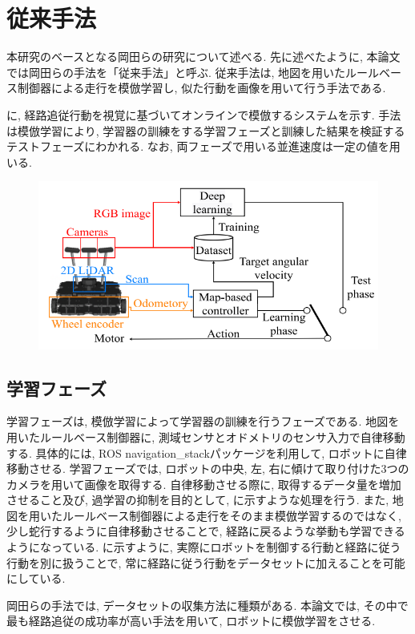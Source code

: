 
\section{従来手法}
本研究のベースとなる岡田らの研究について述べる. 先に述べたように, 本論文では岡田らの手法を「従来手法」と呼ぶ. 従来手法は, 地図を用いたルールベース制御器による走行を模倣学習し, 似た行動を画像を用いて行う手法である.\par
{}に, 経路追従行動を視覚に基づいてオンラインで模倣するシステムを示す. 手法は模倣学習により, 学習器の訓練をする学習フェーズと訓練した結果を検証するテストフェーズにわかれる. なお, 両フェーズで用いる並進速度は一定の値を用いる.

\vspace{3cm}

\begin{figure}[hbtp]
  \centering
 \includegraphics[keepaspectratio, scale=0.5]
      {images/imitation_sys.png}
 \caption{}
 \label{Fig:imitation_sys}
\end{figure}

\newpage

\subsection{学習フェーズ}
学習フェーズは, 模倣学習によって学習器の訓練を行うフェーズである. 地図を用いたルールベース制御器に, 測域センサとオドメトリのセンサ入力で自律移動する. 具体的には, ROS navigation\_stackパッケージを利用して, ロボットに自律移動させる. 学習フェーズでは, ロボットの中央, 左, 右に傾けて取り付けた3つのカメラを用いて画像を取得する. 自律移動させる際に, 取得するデータ量を増加させること及び, 過学習の抑制を目的として, に示すような処理を行う. また, 地図を用いたルールベース制御器による走行をそのまま模倣学習するのではなく, 少し蛇行するように自律移動させることで, 経路に戻るような挙動も学習できるようになっている. に示すように, 実際にロボットを制御する行動と経路に従う行動を別に扱うことで, 常に経路に従う行動をデータセットに加えることを可能にしている. 
\par
岡田らの手法では, データセットの収集方法に種類がある. 
本論文では, その中で最も経路追従の成功率が高い手法を用いて, ロボットに模倣学習をさせる.

